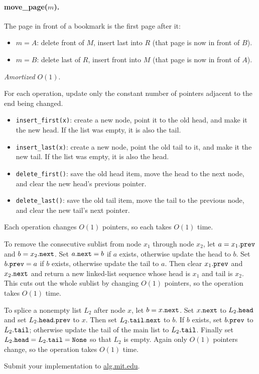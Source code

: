 \documentclass[12pt,twoside]{article}
\begin{document}
\begin{problems}
\paragraph{move\_page($m$).}
The page in front of a bookmark is the first page after it:
\begin{itemize}
    \item $m=A$: delete front of $M$, insert last into $R$
    (that page is now in front of $B$).
    \item $m=B$: delete last of $R$, insert front into $M$
    (that page is now in front of $A$).
\end{itemize}
{\em Amortized} $O(1)$.

\newpage
\problem  %

\begin{problemparts}
\problempart %
For each operation, update only the constant number of pointers adjacent to the end being changed.
\begin{itemize}
    \item {\tt insert\_first(x)}: create a new node, point it to the old head, and make it the new head. If the list was empty, it is also the tail.
    \item {\tt insert\_last(x)}: create a new node, point the old tail to it, and make it the new tail. If the list was empty, it is also the head.
    \item {\tt delete\_first()}: save the old head item, move the head to the next node, and clear the new head's previous pointer.
    \item {\tt delete\_last()}: save the old tail item, move the tail to the previous node, and clear the new tail's next pointer.
\end{itemize}
Each operation changes $O(1)$ pointers, so each takes $O(1)$ time.

\problempart %
To remove the consecutive sublist from node $x_1$ through node $x_2$, let
$a = x_1.{\tt prev}$ and $b = x_2.{\tt next}$.
Set $a.{\tt next} = b$ if $a$ exists, otherwise update the head to $b$.
Set $b.{\tt prev} = a$ if $b$ exists, otherwise update the tail to $a$.
Then clear $x_1.{\tt prev}$ and $x_2.{\tt next}$ and return a new linked-list sequence whose head is $x_1$ and tail is $x_2$.
This cuts out the whole sublist by changing $O(1)$ pointers, so the operation takes $O(1)$ time.

\problempart %
To splice a nonempty list $L_2$ after node $x$, let $b = x.{\tt next}$.
Set $x.{\tt next}$ to $L_2.{\tt head}$ and set $L_2.{\tt head}.{\tt prev}$ to $x$.
Then set $L_2.{\tt tail}.{\tt next}$ to $b$.
If $b$ exists, set $b.{\tt prev}$ to $L_2.{\tt tail}$; otherwise update the tail of the main list to $L_2.{\tt tail}$.
Finally set $L_2.{\tt head} = L_2.{\tt tail} = {\tt None}$ so that $L_2$ is empty.
Again only $O(1)$ pointers change, so the operation takes $O(1)$ time.

\problempart Submit your implementation to {\small\url{alg.mit.edu}}.
\end{problemparts}

\end{problems}
\end{document}
